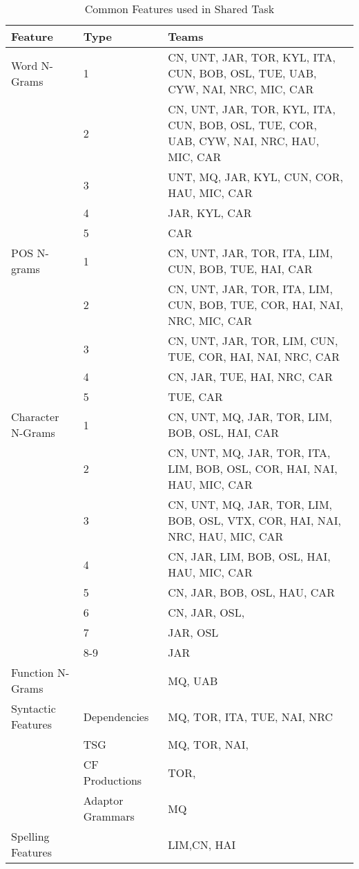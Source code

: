 \documentclass[11pt,letterpaper]{article}
\begin{document}
\begin{table*}[!ht]
\begin{small}
\begin{tabular}{|l|l|p{9.5cm}|}
\hline
{\bf Feature} & {\bf Type} & {\bf Teams} \\  \hline
Word N-Grams       & 1      & CN, UNT, JAR, TOR, KYL, ITA, CUN, BOB, OSL, TUE, UAB, CYW, NAI, NRC, MIC, CAR   \\ \hline
		   & 2      & CN, UNT, JAR, TOR, KYL, ITA, CUN, BOB, OSL, TUE, COR, UAB, CYW, NAI, NRC, HAU, MIC, CAR \\ \hline
                   & 3      & UNT, MQ, JAR, KYL, CUN, COR, HAU, MIC, CAR  \\ \hline
                   & 4      & JAR, KYL, CAR   \\ \hline
		   & 5      & CAR \\ \hline
POS N-grams        & 1      & CN, UNT, JAR, TOR, ITA, LIM, CUN, BOB, TUE, HAI, CAR  \\ \hline
		   & 2      & CN, UNT, JAR, TOR, ITA, LIM, CUN, BOB, TUE, COR, HAI, NAI, NRC, MIC, CAR   \\ \hline
                   & 3      & CN, UNT, JAR, TOR, LIM, CUN, TUE, COR, HAI, NAI, NRC, CAR     \\ \hline
                   & 4      & CN, JAR, TUE, HAI, NRC, CAR    \\ \hline
                   & 5      & TUE, CAR \\ \hline
Character N-Grams  & 1      & CN, UNT, MQ, JAR, TOR, LIM, BOB, OSL, HAI, CAR  \\ \hline
                   & 2      & CN, UNT, MQ, JAR, TOR, ITA, LIM, BOB, OSL, COR, HAI, NAI, HAU, MIC, CAR  \\ \hline
                   & 3      & CN, UNT, MQ, JAR, TOR, LIM, BOB, OSL, VTX, COR, HAI, NAI, NRC, HAU, MIC, CAR \\ \hline
                   & 4      & CN, JAR, LIM, BOB, OSL, HAI, HAU, MIC, CAR \\ \hline
                   & 5      & CN, JAR, BOB, OSL, HAU, CAR  \\ \hline
                   & 6      & CN, JAR, OSL,   \\ \hline
	           & 7      & JAR, OSL \\ \hline
                   & 8-9    & JAR \\ \hline
Function N-Grams   &        & MQ, UAB  \\ \hline
Syntactic Features & Dependencies        & MQ, TOR, ITA, TUE, NAI, NRC \\ \hline
                   & TSG                 & MQ, TOR, NAI,  \\ \hline
                   & CF Productions      & TOR, \\ \hline
		   & Adaptor Grammars  & MQ  \\ \hline
Spelling Features  &        &   LIM,CN, HAI \\ \hline
\end{tabular}
\end{small}
\caption{Common Features used in Shared Task\label{tab:common-features}}
\end{table*}
\end{document}
